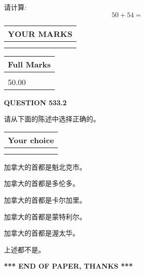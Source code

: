 \documentclass{ctexart}
\begin{document}
  
 
请计算:
\begin{equation}
50 +  %
54 = \nonumber
\end{equation}
 

 

 
  
\vspace{0.2in}
  
\noindent\begin{tabular}{|l|}
\hline
 YOUR MARKS  \\
\hline
 \\ 
 \\ 
\hline
\end{tabular}
\hspace{0.05in} \begin{tabular}{|l|}
\hline
 Full Marks  \\
\hline
 \\ 
50.00 \\
\hline
\end{tabular}
{\textbf{\Large{QUESTION
533.2 
}}}
  
  
请从下面的陈述中选择正确的。
  
  
\noindent\hspace{3.0in} \begin{tabular}{|l|}
\hline
Your choice \\
\hline
 \\ 
 \\ 
\hline
\end{tabular}
  
  
 
 
加拿大的首都是魁北克市。
 
 
加拿大的首都是多伦多。
 
 
加拿大的首都是卡尔加里。
 
 
加拿大的首都是蒙特利尔。
 
 
加拿大的首都是渥太华。
 
 
 上述都不是。
 
 
   
   
 \vspace{0.2in}
 
   
   
   
   
\vspace{1.0in} 
{\textbf{\large{ *** END OF PAPER, THANKS *** }}} 
   
\end{document}
